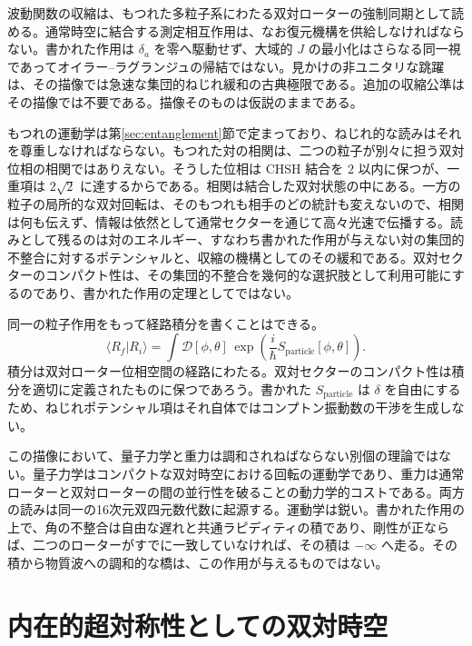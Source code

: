 \documentclass[a4paper]{article}
\begin{document}
波動関数の収縮は、もつれた多粒子系にわたる双対ローターの強制同期として読める。通常時空に結合する測定相互作用は、なお復元機構を供給しなければならない。書かれた作用は $\delta_a$ を零へ駆動せず、大域的 $J$ の最小化はさらなる同一視であってオイラー--ラグランジュの帰結ではない。見かけの非ユニタリな跳躍は、その描像では急速な集団的ねじれ緩和の古典極限である。追加の収縮公準はその描像では不要である。描像そのものは仮説のままである。

もつれの運動学は第\ref{sec:entanglement}節で定まっており、ねじれ的な読みはそれを尊重しなければならない。もつれた対の相関は、二つの粒子が別々に担う双対位相の相関ではありえない。そうした位相は CHSH 結合を $2$ 以内に保つが、一重項は $2\sqrt2$ に達するからである。相関は結合した双対状態の中にある。一方の粒子の局所的な双対回転は、そのもつれも相手のどの統計も変えないので、相関は何も伝えず、情報は依然として通常セクターを通じて高々光速で伝播する。読みとして残るのは対のエネルギー、すなわち書かれた作用が与えない対の集団的不整合に対するポテンシャルと、収縮の機構としてのその緩和である。双対セクターのコンパクト性は、その集団的不整合を幾何的な選択肢として利用可能にするのであり、書かれた作用の定理としてではない。

同一の粒子作用をもって経路積分を書くことはできる。
\[
\langle R_f | R_i \rangle = \int \mathcal{D}[\phi,\theta] \, \exp\left( \frac{i}{\hbar} S_\text{particle}[\phi,\theta] \right).
\]
積分は双対ローター位相空間の経路にわたる。双対セクターのコンパクト性は積分を適切に定義されたものに保つであろう。書かれた $S_{\mathrm{particle}}$ は $\delta$ を自由にするため、ねじれポテンシャル項はそれ自体ではコンプトン振動数の干渉を生成しない。

この描像において、量子力学と重力は調和されねばならない別個の理論ではない。量子力学はコンパクトな双対時空における回転の運動学であり、重力は通常ローターと双対ローターの間の並行性を破ることの動力学的コストである。両方の読みは同一の16次元双四元数代数に起源する。運動学は鋭い。書かれた作用の上で、角の不整合は自由な遅れと共通ラピディティの積であり、剛性が正ならば、二つのローターがすでに一致していなければ、その積は $-\infty$ へ走る。その積から物質波への調和的な橋は、この作用が与えるものではない。

\section{内在的超対称性としての双対時空}
\label{sec:susy}
\end{document}
